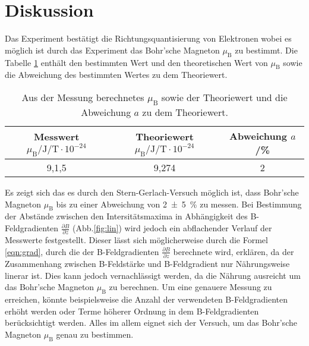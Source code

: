 \section{Diskussion}
\label{sec:Diskussion}
Das Experiment bestätigt die Richtungsquantisierung von Elektronen wobei
es möglich ist durch das Experiment das Bohr'sche Magneton $\mu_\mathrm{B}$
zu bestimmt. Die Tabelle \ref{tab:erg} enthält den bestimmten Wert
und den theoretischen  Wert von $\mu_\mathrm{B}$ sowie die Abweichung
des bestimmten Wertes zu dem Theoriewert.
\begin{table}
  \centering
  \caption{Aus der Messung berechnetes $\mu_\mathrm{B}$ sowie der Theoriewert und die Abweichung $a$ zu dem Theoriewert.}
  \label{tab:erg}
  \begin{tabular}{c c c}
    \toprule
  Messwert $\mu_\mathrm{B} / \si{\joule\per\tesla}\cdot 10^{-24} $ & Theoriewert $\mu_\mathrm{B} / \si{\joule\per\tesla }\cdot 10^{-24}$ & Abweichung $a$/\si{\percent}\\
    \midrule
9,1\pm0,5 & 9,274 & 2\pm5 \\
    \bottomrule
  \end{tabular}
\end{table}
Es zeigt sich das es durch den Stern-Gerlach-Versuch möglich ist, dass
Bohr'sche Magneton $\mu_\mathrm{B}$ bis zu einer Abweichung von \SI{2(5)}{\percent}
zu messen. Bei Bestimmung der Abstände zwischen den Intersitätsmaxima in Abhängigkeit
des B-Feldgradienten $\frac{\partial B}{\partial z}$ (Abb.\ref{fig:lin})
wird jedoch ein abflachender Verlauf der Messwerte festgestellt.
Dieser lässt sich möglicherweise durch die Formel \eqref{eqn:grad}, durch die der B-Feldgradienten $\frac{\partial B}{\partial z}$ berechnete wird,
 erklären, da der Zusammenhang zwischen B-Feldstärke und B-Feldgradient nur Nährungsweise linerar ist.
Dies kann jedoch vernachlässigt werden, da die Nährung ausreicht um das Bohr'sche Magneton $\mu_\mathrm{B}$ zu berechnen.
Um eine genauere Messung zu erreichen, könnte beispielsweise die Anzahl der
verwendeten B-Feldgradienten erhöht werden oder Terme höherer Ordnung in dem B-Feldgradienten berücksichtigt werden.
Alles im allem eignet sich der Versuch, um das Bohr'sche Magneton $\mu_\mathrm{B}$
genau zu bestimmen.
